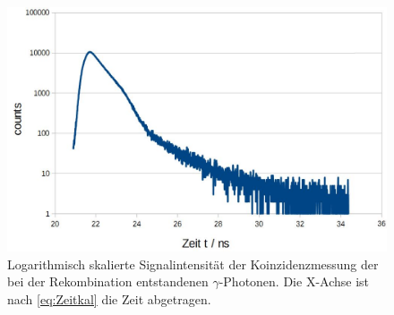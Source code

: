 \documentclass[numbers=noenddot,a4paper]{scrartcl}
\begin{document}
\begin{figure}[!h]
	\centering
	\includegraphics[width=0.7\columnwidth]{Messung1}
	\caption{Logarithmisch skalierte Signalintensität der Koinzidenzmessung der bei der Rekombination entstandenen $\gamma$-Photonen. Die X-Achse ist nach \eqref{eq:Zeitkal} die Zeit abgetragen.}
	\label{abb:Messung1}
\end{figure}
\end{document}

